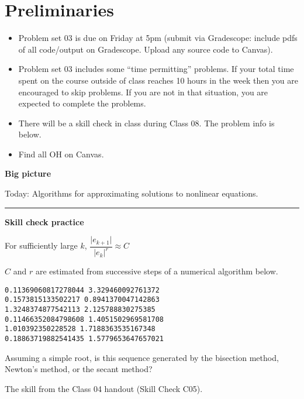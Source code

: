 \documentclass[12pt,letterpaper,noanswers]{exam}
\begin{document}
 \pdfpageheight 11in 
  \pdfpagewidth 8.5in

\noindent 

\section*{Preliminaries}

\begin{itemize}
\itemsep0pt
\item Problem set 03 is due on Friday at 5pm (submit via Gradescope: include pdfs of all code/output on Gradescope.  Upload any source code to Canvas).
\item Problem set 03 includes some ``time permitting'' problems.  If your total time spent on the course outside of class reaches 10 hours in the week then you are encouraged to skip problems.  If you are not in that situation, you are expected to complete the problems.
\item There will be a skill check in class during Class 08.  The problem info is below.
\item Find all OH on Canvas.
\end{itemize}



\noindent\textbf{Big picture}

Today: Algorithms for approximating solutions to nonlinear equations.

\vspace{0.2cm}
\hrule
\vspace{0.2cm}

\noindent \textbf{Skill check practice}
\begin{questions}
\item For sufficiently large $k$, $\dfrac{\vert e_{k+1}\vert}{\vert e_k\vert^r} \approx C$


$C$ and $r$ are estimated from successive steps of a numerical algorithm below.

\begin{verbatim}
0.11369060817278044 3.329460092761372
0.1573815133502217 0.8941370047142863
1.3248374877542113 2.125788830275385
0.11466352084798608 1.4051502969581708
1.010392350228528 1.7188363535167348
0.18863719882541435 1.5779653647657021
\end{verbatim}

Assuming a simple root, is this sequence generated by the bisection method, Newton's method, or the secant method?

\item The skill from the Class 04 handout (Skill Check C05).
\end{questions}
\end{document}

